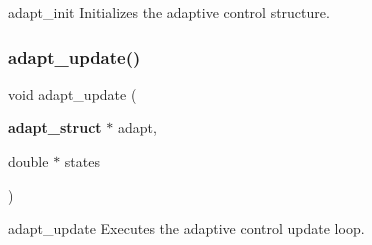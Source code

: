 adapt\+\_\+init Initializes the adaptive control structure. \mbox{\label{adapt_8c_a384336c7e7cea8ea046140fc861b596f}} 
\subsubsection{adapt\+\_\+update()}
{\footnotesize\ttfamily void adapt\+\_\+update (\begin{DoxyParamCaption}\item[{\textbf{ adapt\+\_\+struct} $\ast$}]{adapt,  }\item[{double $\ast$}]{states }\end{DoxyParamCaption})}

adapt\+\_\+update Executes the adaptive control update loop. 